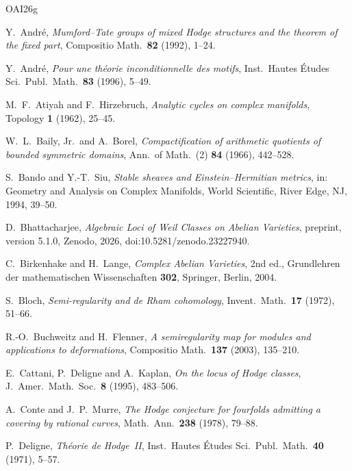 \cleardoublepage
{}
{}
\begin{thebibliography}{OAI26g}

Y.~Andr\'e, \emph{Mumford--Tate groups of mixed Hodge structures and the
theorem of the fixed part}, Compositio Math.\ \textbf{82} (1992), 1--24.

Y.~Andr\'e, \emph{Pour une th\'eorie inconditionnelle des motifs}, Inst.\
Hautes \'Etudes Sci.\ Publ.\ Math.\ \textbf{83} (1996), 5--49.

M.~F.~Atiyah and F.~Hirzebruch, \emph{Analytic cycles on complex
manifolds}, Topology \textbf{1} (1962), 25--45.

W.~L.~Baily, Jr.\ and A.~Borel, \emph{Compactification of arithmetic
quotients of bounded symmetric domains}, Ann.\ of Math.\ (2) \textbf{84}
(1966), 442--528.

S.~Bando and Y.-T.~Siu, \emph{Stable sheaves and Einstein--Hermitian
metrics}, in: Geometry and Analysis on Complex Manifolds, World Scientific,
River Edge, NJ, 1994, 39--50.

D.~Bhattacharjee, \emph{Algebraic Loci of Weil Classes on Abelian
Varieties}, preprint, version 5.1.0, Zenodo, 2026,
doi:10.5281/zenodo.23227940.

C.~Birkenhake and H.~Lange, \emph{Complex Abelian Varieties}, 2nd ed.,
Grundlehren der mathematischen Wissenschaften \textbf{302}, Springer,
Berlin, 2004.

S.~Bloch, \emph{Semi-regularity and de Rham cohomology}, Invent.\ Math.\
\textbf{17} (1972), 51--66.

R.-O.~Buchweitz and H.~Flenner, \emph{A semiregularity map for modules and
applications to deformations}, Compositio Math.\ \textbf{137} (2003),
135--210.

E.~Cattani, P.~Deligne and A.~Kaplan, \emph{On the locus of Hodge classes},
J.\ Amer.\ Math.\ Soc.\ \textbf{8} (1995), 483--506.

A.~Conte and J.~P.~Murre, \emph{The Hodge conjecture for fourfolds
admitting a covering by rational curves}, Math.\ Ann.\ \textbf{238} (1978),
79--88.

P.~Deligne, \emph{Th\'eorie de Hodge~II}, Inst.\ Hautes \'Etudes Sci.\
Publ.\ Math.\ \textbf{40} (1971), 5--57.


\end{thebibliography}
